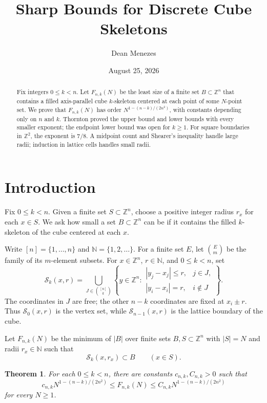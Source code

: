 \documentclass[11pt]{amsart}
\title{Sharp Bounds for Discrete Cube Skeletons}
\author{Dean Menezes}
\date{August 25, 2026}
\numberwithin{equation}{section}
\theoremstyle{plain}
\newtheorem{theorem}{Theorem}[section]
\theoremstyle{definition}
\newcommand{\Z}{\mathbb{Z}}
\newcommand{\N}{\mathbb{N}}
\newcommand{\cS}{\mathcal{S}}
\begin{document}
\begin{abstract}
Fix integers $0\leq k<n$.  Let $F_{n,k}(N)$ be the least size of a finite
set $B\subset\Z^n$ that contains a filled axis-parallel cube $k$-skeleton
centered at each point of some $N$-point set.  We prove that $F_{n,k}(N)$ has
order $N^{1-(n-k)/(2n^2)}$, with constants depending only on $n$ and $k$.
Thornton proved the upper bound and lower bounds with every smaller exponent;
the endpoint lower bound was open for $k\geq1$.  For square boundaries in
$\Z^2$, the exponent is $7/8$.  A midpoint count and Shearer's inequality
handle large radii; induction in lattice cells handles small radii.
\end{abstract}

\maketitle

\section{Introduction}

Fix $0\leq k<n$.  Given a finite set $S\subset\Z^n$, choose a positive integer
radius $r_x$ for each $x\in S$.  We ask how small a set $B\subset\Z^n$ can be
if it contains the filled $k$-skeleton of the cube centered at each $x$.

Write $[n]=\{1,\ldots,n\}$ and $\N=\{1,2,\ldots\}$.  For a finite set $E$,
let $\binom{E}{m}$ be the family of its $m$-element subsets.  For $x\in\Z^n$,
$r\in\N$, and $0\leq k<n$, set
\[
 \cS_k(x,r)=
 \bigcup_{J\in\binom{[n]}{k}}
 \left\{
 y\in\Z^n:
 \begin{array}{ll}
 |y_j-x_j|\leq r,&j\in J,\\
 |y_i-x_i|=r,&i\notin J
 \end{array}
 \right\}.
\]
The coordinates in $J$ are free; the other $n-k$ coordinates are fixed at
$x_i\pm r$.  Thus $\cS_0(x,r)$ is the vertex set, while
$\cS_{n-1}(x,r)$ is the lattice boundary of the cube.

Let $F_{n,k}(N)$ be the minimum of $|B|$ over finite sets
$B,S\subset\Z^n$ with $|S|=N$ and radii $r_x\in\N$ such that
\[
 \cS_k(x,r_x)\subset B\qquad(x\in S).
\]

\begin{theorem}\label{thm:main}
For each $0\leq k<n$, there are constants $c_{n,k},C_{n,k}>0$ such that
\[
 c_{n,k}N^{1-(n-k)/(2n^2)}
 \leq F_{n,k}(N)
 \leq C_{n,k}N^{1-(n-k)/(2n^2)}
\]
for every $N\geq1$.
\end{theorem}
\end{document}
